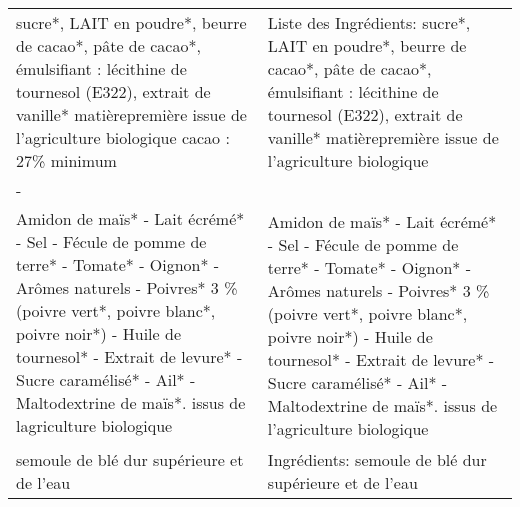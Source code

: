 \begin{longtable}{p{7cm}p{7cm}}
\bottomrule
\endlastfoot
                                                                                                 sucre*, LAIT en poudre*, beurre de cacao*, pâte de cacao*, émulsifiant : lécithine de tournesol (E322), extrait de \newline vanille* \newline * matièrepremière issue de l'agriculture biologique \newline cacao : 27\% minimum &                                                                                            Liste des Ingrédients: \newline sucre*,  LAIT en poudre*,  beurre de cacao*,  pâte de cacao*,  émulsifiant : lécithine de tournesol (E322),  extrait de  \newline vanille* \newline * matièrepremière issue de l'agriculture biologique \\
                                                                                                                                                                                                                                                                                                      - &                                                                                                                                                                                                                                                                                                           \\
 Amidon de maïs* - Lait écrémé* - Sel - Fécule de pomme de terre* - Tomate* - Oignon* - Arômes naturels - Poivres* 3 \% (poivre vert*, poivre blanc*, poivre noir*) - Huile de tournesol* - Extrait de levure* - Sucre caramélisé* - Ail* - Maltodextrine de maïs*. \newline * issus de lagriculture biologique &  Amidon de maïs* - Lait écrémé* - Sel - Fécule de pomme de terre* - Tomate* - Oignon* - Arômes naturels - Poivres* 3 \% (poivre vert*, poivre blanc*,  \newline poivre noir*) - Huile de tournesol* - Extrait de levure* - Sucre caramélisé* - Ail* - Maltodextrine de maïs*.  \newline * issus de l’agriculture biologique \\
                                                                                                                                                                                                                                                              semoule de blé dur supérieure et de l'eau &                                                                                                                                                                                                                                                    Ingrédients: semoule de blé dur supérieure et de l'eau  \\

\end{longtable}
